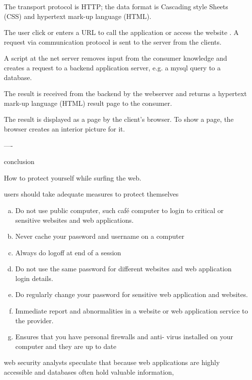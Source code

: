\documentclass[12pt]{article}
\begin{document}
 The transport
protocol is HTTP; the data format is Cascading style Sheets
(CSS) and hypertext mark-up language (HTML). 

The user
click or enters a URL to call the application or access the website .
 A request via communication protocol is sent to
the server from the clients. 

A script at the net server removes
input from the consumer knowledge and creates a request to a backend application server, e.g. a mysql query to a database.

The result is received from the backend by the webserver and
returns a hypertext mark-up language (HTML) result page to the consumer. 

The result is displayed as a page by the client’s
browser. 
To show a page, the browser creates an interior
picture for it. 

----

conclusion 

How to protect yourself while surfing the web.

users should take adequate measures to protect
themselves

\begin{enumerate}[(a)]

\item  Do not use public computer, such café computer to
login to critical or sensitive websites and web
applications.
\item  Never cache your password and username on a
computer

\item Always do logoff at end of a session
\item Do  not use the same password for different
websites and web application login details.

\item  Do regularly change your password for sensitive
web application and websites.

\item Immediate report and abnormalities in a website or
web application service to the provider.

\item Ensures that you have personal firewalls and anti-
virus installed on your computer and they are up to
date
\end{enumerate}



web security analysts speculate that because web applications are
highly accessible and databases often hold valuable information,
\end{document}
